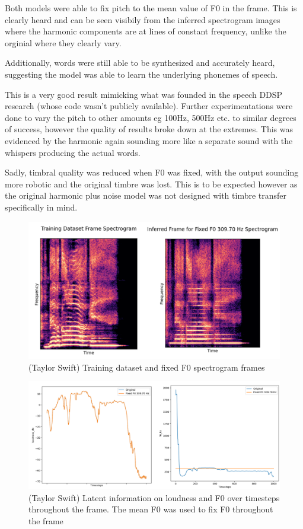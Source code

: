 Both models were able to fix pitch to the mean value of F0 in the frame. This is clearly heard and can be seen visibily from the inferred spectrogram images where the harmonic components are at lines of constant frequency, unlike the orginial where they clearly vary.

Additionally, words were still able to be synthesized and accurately heard, suggesting the model was able to learn the underlying phonemes of speech.

This is a very good result mimicking what was founded in the speech DDSP research\cite{SpeechDDSP} (whose code wasn't publicly available). Further experimentations were done to vary the pitch to other amounts eg 100Hz, 500Hz etc. to similar degrees of success, however the quality of results broke down at the extremes. This was evidenced by the harmonic again sounding more like a separate sound with the whispers producing the actual words.

Sadly, timbral quality was reduced when F0 was fixed, with the output sounding more robotic and the original timbre was lost. This is to be expected however as the original harmonic plus noise model was not designed with timbre transfer specifically in mind\cite{OriginalDDSP}.

\begin{figure}[H]
    \centering
    \includegraphics[width=\textwidth]{research/results/TaylorSwift/FixedF0.png}
    \caption{(Taylor Swift) Training dataset and fixed F0 spectrogram frames}
\end{figure}

\begin{figure}[H]
    \centering
    \includegraphics[width=\textwidth]{research/results/TaylorSwift/FixedF0Graphs.png}
    \caption{(Taylor Swift) Latent information on loudness and F0 over timesteps throughout the frame. The mean F0 was used to fix F0 throughout the frame}
\end{figure}

